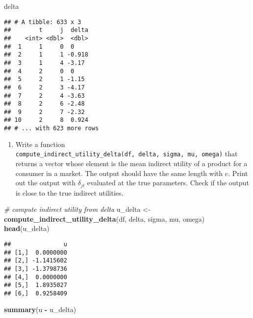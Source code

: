 \documentclass[
]{book}
\newenvironment{Shaded}{\begin{snugshade}}{\end{snugshade}}
\newcommand{\CommentTok}[1]{\textcolor[rgb]{0.56,0.35,0.01}{\textit{#1}}}
\newcommand{\KeywordTok}[1]{\textcolor[rgb]{0.13,0.29,0.53}{\textbf{#1}}}
\newcommand{\NormalTok}[1]{#1}
\newcommand{\OperatorTok}[1]{\textcolor[rgb]{0.81,0.36,0.00}{\textbf{#1}}}
\newcommand{\StringTok}[1]{\textcolor[rgb]{0.31,0.60,0.02}{#1}}
\providecommand{\tightlist}{%
  \setlength{\itemsep}{0pt}\setlength{\parskip}{0pt}}
\begin{document}
\begin{Shaded}
\begin{Highlighting}[]
\NormalTok{delta}
\end{Highlighting}
\end{Shaded}

\begin{verbatim}
## # A tibble: 633 x 3
##        t     j  delta
##    <int> <dbl>  <dbl>
##  1     1     0  0    
##  2     1     1 -0.918
##  3     1     4 -3.17 
##  4     2     0  0    
##  5     2     1 -1.15 
##  6     2     3 -4.17 
##  7     2     4 -3.63 
##  8     2     6 -2.48 
##  9     2     7 -2.32 
## 10     2     8  0.924
## # ... with 623 more rows
\end{verbatim}

\begin{enumerate}
\def\labelenumi{\arabic{enumi}.}
\setcounter{enumi}{4}
\tightlist
\item
  Write a function \texttt{compute\_indirect\_utility\_delta(df,\ delta,\ sigma,\ mu,\ omega)} that returns a vector whose element is the mean indirect utility of a product for a consumer in a market. The output should have the same length with \(e\). Print out the output with \(\delta_{jt}\) evaluated at the true parameters. Check if the output is close to the true indirect utilities.
\end{enumerate}

\begin{Shaded}
\begin{Highlighting}[]
\CommentTok{# compute indirect utility from delta}
\NormalTok{u_delta <-}
\StringTok{  }\KeywordTok{compute_indirect_utility_delta}\NormalTok{(df, delta, sigma,}
\NormalTok{                                 mu, omega)}
\KeywordTok{head}\NormalTok{(u_delta)}
\end{Highlighting}
\end{Shaded}

\begin{verbatim}
##               u
## [1,]  0.0000000
## [2,] -1.1415602
## [3,] -1.3798736
## [4,]  0.0000000
## [5,]  1.8935027
## [6,]  0.9258409
\end{verbatim}

\begin{Shaded}
\begin{Highlighting}[]
\KeywordTok{summary}\NormalTok{(u }\OperatorTok{-}\StringTok{ }\NormalTok{u_delta)}
\end{Highlighting}
\end{Shaded}
\end{document}
